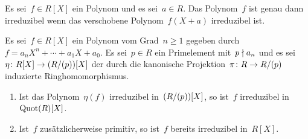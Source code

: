 \begin{proposition}
  Es sei~$f \in R[X]$ ein Polynom und es sei~$a \in R$.
  Das Polynom~$f$ ist genau dann irreduzibel wenn das verschobene Polynom~$f(X + a)$ irreduzibel ist.
\end{proposition}

\begin{proposition}[Reduktionskriterium]
  Es sei~$f \in R[X]$ ein Polynom vom Grad~$n \geq 1$ gegeben durch~$f = a_n X^n + \dotsb + a_1 X + a_0$.
  Es sei~$p \in R$ ein Primelement mit~$p \nmid a_n$ und es sei~$\eta \colon R[X] \to (R/\genideal{p})[X]$ der durch die kanonische Projektion~$\pi \colon R \to R / \genideal{p}$ induzierte Ringhomomorphismus.
  \begin{enumerate}
    \item
      Ist das Polynom~$\eta(f)$ irreduzibel in~$(R/(p))[X]$, so ist~$f$ irreduzibel in~$\operatorname{Quot}(R)[X]$.
    \item
      Ist~$f$ zusätzlicherweise primitiv, so ist~$f$ bereits irreduzibel in~$R[X]$.
  \end{enumerate}
\end{proposition}
